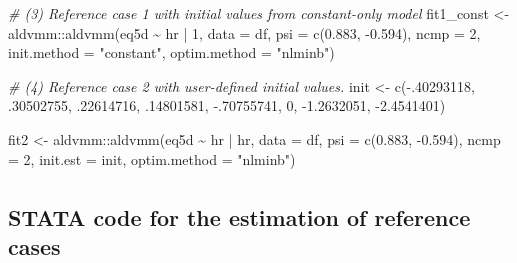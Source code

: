 \documentclass[
]{article}
\newenvironment{Shaded}{\begin{snugshade}}{\end{snugshade}}
\newcommand{\AttributeTok}[1]{\textcolor[rgb]{0.77,0.63,0.00}{#1}}
\newcommand{\CommentTok}[1]{\textcolor[rgb]{0.56,0.35,0.01}{\textit{#1}}}
\newcommand{\DecValTok}[1]{\textcolor[rgb]{0.00,0.00,0.81}{#1}}
\newcommand{\FloatTok}[1]{\textcolor[rgb]{0.00,0.00,0.81}{#1}}
\newcommand{\FunctionTok}[1]{\textcolor[rgb]{0.00,0.00,0.00}{#1}}
\newcommand{\NormalTok}[1]{#1}
\newcommand{\OtherTok}[1]{\textcolor[rgb]{0.56,0.35,0.01}{#1}}
\newcommand{\SpecialCharTok}[1]{\textcolor[rgb]{0.00,0.00,0.00}{#1}}
\newcommand{\StringTok}[1]{\textcolor[rgb]{0.31,0.60,0.02}{#1}}
\begin{document}
\begin{Shaded}
\begin{Highlighting}[]
\CommentTok{\# (3) Reference case 1 with initial values from constant{-}only model}
\NormalTok{fit1\_const }\OtherTok{\textless{}{-}}\NormalTok{ aldvmm}\SpecialCharTok{::}\FunctionTok{aldvmm}\NormalTok{(eq5d }\SpecialCharTok{\textasciitilde{}}\NormalTok{ hr }\SpecialCharTok{|} \DecValTok{1}\NormalTok{,}
                             \AttributeTok{data =}\NormalTok{ df,}
                             \AttributeTok{psi =} \FunctionTok{c}\NormalTok{(}\FloatTok{0.883}\NormalTok{, }\SpecialCharTok{{-}}\FloatTok{0.594}\NormalTok{),}
                             \AttributeTok{ncmp =} \DecValTok{2}\NormalTok{,}
                             \AttributeTok{init.method =} \StringTok{"constant"}\NormalTok{,}
                             \AttributeTok{optim.method =} \StringTok{"nlminb"}\NormalTok{)}

\CommentTok{\# (4) Reference case 2 with user{-}defined initial values.}
\NormalTok{init }\OtherTok{\textless{}{-}} \FunctionTok{c}\NormalTok{(}\SpecialCharTok{{-}}\NormalTok{.}\DecValTok{40293118}\NormalTok{, .}\DecValTok{30502755}\NormalTok{, .}\DecValTok{22614716}\NormalTok{, .}\DecValTok{14801581}\NormalTok{, }\SpecialCharTok{{-}}\NormalTok{.}\DecValTok{70755741}\NormalTok{, }\DecValTok{0}\NormalTok{, }
          \SpecialCharTok{{-}}\FloatTok{1.2632051}\NormalTok{, }\SpecialCharTok{{-}}\FloatTok{2.4541401}\NormalTok{)}

\NormalTok{fit2 }\OtherTok{\textless{}{-}}\NormalTok{ aldvmm}\SpecialCharTok{::}\FunctionTok{aldvmm}\NormalTok{(eq5d }\SpecialCharTok{\textasciitilde{}}\NormalTok{ hr }\SpecialCharTok{|}\NormalTok{ hr,}
                       \AttributeTok{data =}\NormalTok{ df,}
                       \AttributeTok{psi =} \FunctionTok{c}\NormalTok{(}\FloatTok{0.883}\NormalTok{, }\SpecialCharTok{{-}}\FloatTok{0.594}\NormalTok{),}
                       \AttributeTok{ncmp =} \DecValTok{2}\NormalTok{,}
                       \AttributeTok{init.est =}\NormalTok{ init,}
                       \AttributeTok{optim.method =} \StringTok{"nlminb"}\NormalTok{)}
\end{Highlighting}
\end{Shaded}

\newpage

\hypertarget{stata-code-for-the-estimation-of-reference-cases}{%
\subsection{\texorpdfstring{STATA\textsuperscript{\textregistered} code for the estimation of reference cases}{STATA code for the estimation of reference cases}}\label{stata-code-for-the-estimation-of-reference-cases}}
\end{document}
